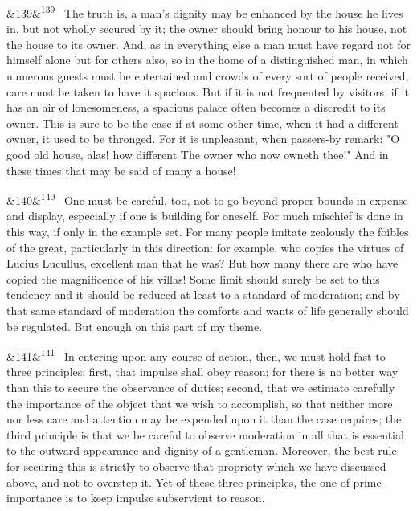 \documentclass[12pt]{article}
\newcommand{\para}[1][]{\par\noindent\ifx&#1&\else\textsuperscript{\footnotesize #1}~\fi}
\begin{document}
\para[139] The truth is, a man's dignity may be enhanced by the house he lives in, but not wholly secured by it; the owner should bring honour to his house, not the house to its owner. And, as in everything else a man must have regard not for himself alone but for others also, so in the home of a distinguished man, in which numerous guests must be entertained and crowds of every sort of people received, care must be taken to have it spacious. But if it is not frequented by visitors, if it has an air of lonesomeness, a spacious palace often becomes a discredit to its owner. This is sure to be the case if at some other time, when it had a different owner, it used to be thronged. For it is unpleasant, when passers-by remark: "O good old house, alas! how different The owner who now owneth thee!" And in these times that may be said of many a house!

\para[140] One must be careful, too, not to go beyond proper bounds in expense and display, especially if one is building for oneself. For much mischief is done in this way, if only in the example set. For many people imitate zealously the foibles of the great, particularly in this direction: for example, who copies the virtues of Lucius Lucullus, excellent man that he was? But how many there are who have copied the magnificence of his villas! Some limit should surely be set to this tendency and it should be reduced at least to a standard of moderation; and by that same standard of moderation the comforts and wants of life generally should be regulated. But enough on this part of my theme.

\para[141] In entering upon any course of action, then, we must hold fast to three principles: first, that impulse shall obey reason; for there is no better way than this to secure the observance of duties; second, that we estimate carefully the importance of the object that we wish to accomplish, so that neither more nor less care and attention may be expended upon it than the case requires; the third principle is that we be careful to observe moderation in all that is essential to the outward appearance and dignity of a gentleman. Moreover, the best rule for securing this is strictly to observe that propriety which we have discussed above, and not to overstep it. Yet of these three principles, the one of prime importance is to keep impulse subservient to reason.
\end{document}
